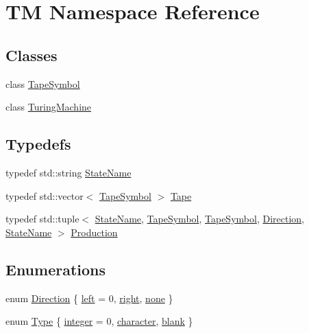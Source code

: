 \hypertarget{namespaceTM}{\section{\-T\-M \-Namespace \-Reference}
\label{d6/d65/namespaceTM}
}
\subsection*{\-Classes}
\begin{DoxyCompactItemize}
\item 
class \hyperlink{classTM_1_1TapeSymbol}{\-Tape\-Symbol}
\item 
class \hyperlink{classTM_1_1TuringMachine}{\-Turing\-Machine}
\end{DoxyCompactItemize}
\subsection*{\-Typedefs}
\begin{DoxyCompactItemize}
\item 
typedef std\-::string \hyperlink{namespaceTM_a852554502c474841ede5736b807839ff}{\-State\-Name}
\item 
typedef std\-::vector$<$ \hyperlink{classTM_1_1TapeSymbol}{\-Tape\-Symbol} $>$ \hyperlink{namespaceTM_a20b31cfe7d86b00db299e72ad48f70af}{\-Tape}
\item 
typedef std\-::tuple$<$ \hyperlink{namespaceTM_a852554502c474841ede5736b807839ff}{\-State\-Name}, \*
\hyperlink{classTM_1_1TapeSymbol}{\-Tape\-Symbol}, \hyperlink{classTM_1_1TapeSymbol}{\-Tape\-Symbol}, \*
\hyperlink{namespaceTM_a7c40dddb5b66504639e0d378ec13792d}{\-Direction}, \hyperlink{namespaceTM_a852554502c474841ede5736b807839ff}{\-State\-Name} $>$ \hyperlink{namespaceTM_a87460339f40338ea4e37433443965554}{\-Production}
\end{DoxyCompactItemize}
\subsection*{\-Enumerations}
\begin{DoxyCompactItemize}
\item 
enum \hyperlink{namespaceTM_a7c40dddb5b66504639e0d378ec13792d}{\-Direction} \{ \hyperlink{namespaceTM_a7c40dddb5b66504639e0d378ec13792dac3682a7842c29b64f35ecbeb70fafb7f}{left} =  0, 
\hyperlink{namespaceTM_a7c40dddb5b66504639e0d378ec13792da7524c80fbbe2893a839a75c97def5911}{right}, 
\hyperlink{namespaceTM_a7c40dddb5b66504639e0d378ec13792dabf7f6892ad2d17d8e27921834d7c3ee2}{none}
 \}
\item 
enum \hyperlink{namespaceTM_ac5907d46a678a9a9fe237dce1768dbad}{\-Type} \{ \hyperlink{namespaceTM_ac5907d46a678a9a9fe237dce1768dbadab9bb640471008bcc22eb57218c7bff41}{integer} =  0, 
\hyperlink{namespaceTM_ac5907d46a678a9a9fe237dce1768dbadac48426601eef44a3d1338b4570940a4e}{character}, 
\hyperlink{namespaceTM_ac5907d46a678a9a9fe237dce1768dbadac0597b9032816eafa95b0ca98dcafa77}{blank}
 \}
\end{DoxyCompactItemize}


